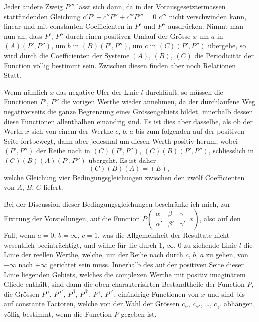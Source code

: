 \documentclass[12pt,a4paper]{book}
\theoremstyle{definition}
\theoremstyle{remark}
\begin{document}
Jeder andere Zweig $P'''$ lässt sich dann, da in der Vorausgesetztermassen stattfindenden Gleichung $c'P' + c''P'' + c'''P''' = 0$ $c'''$ nicht verschwinden kann, linear und mit constanten Coefficienten in $P'$ und $P''$ ausdrücken. Nimmt man nun an, dass $P'$, $P''$ durch einen positiven Umlauf der Grösse $x$ um $a$ in $(A)(P', P'')$, um $b$ in $(B)(P', P'')$, um $c$ in $(C)(P', P'')$ übergehe, so wird durch die Coefficienten der Systeme $(A)$, $(B)$, $(C)$ die Periodicität der Function völlig bestimmt sein. Zwischen diesen finden aber noch Relationen Statt.

Wenn nämlich $x$ das negative Ufer der Linie $l$ durchläuft, so müssen die Functionen $P'$, $P''$ die vorigen Werthe wieder annehmen, da der durchlaufene Weg negativerseits die ganze Begrenzung eines Grössengebiets bildet, innerhalb dessen diese Functionen allenthalben einändrig sind. Es ist dies aber dasselbe, als ob der Werth $x$ sich von einem der Werthe $c$, $b$, $a$ bis zum folgenden auf der positiven Seite fortbewegt, dann aber jedesmal um diesen Werth positiv herum, wobei $(P', P'')$ der Reihe nach in $(C)(P', P'')$, $(C)(B)(P', P'')$, schliesslich in $(C)(B)(A)(P', P'')$ übergeht. Es ist daher
\begin{equation}
(C)(B)(A) = (E), \tag{1}
\end{equation}
welche Gleichung vier Bedingungsgleichungen zwischen den zwölf Coefficienten von $A$, $B$, $C$ liefert.

Bei der Discussion dieser Bedingungsgleichungen beschränke ich mich, zur Fixirung der Vorstellungen, auf die Function $P\left(\begin{array}{ccc|} \alpha & \beta & \gamma \\ \alpha' & \beta' & \gamma' \end{array}\, x\right)$, also auf den Fall, wenn $a = 0$, $b = \infty$, $c = 1$, was die Allgemeinheit der Resultate nicht wesentlich beeinträchtigt, und wähle für die durch $1$, $\infty$, $0$ zu ziehende Linie $l$ die Linie der reellen Werthe, welche, um der Reihe nach durch $c$, $b$, $a$ zu gehen, von $-\infty$ nach $+\infty$ gerichtet sein muss. Innerhalb des auf der positiven Seite dieser Linie liegenden Gebiets, welches die complexen Werthe mit positiv imaginärem Gliede enthält, sind dann die oben charakterisirten Bestandtheile der Function $P$, die Grössen $P^{\alpha}$, $P^{\alpha'}$, $P^{\beta}$, $P^{\beta'}$, $P^{\gamma}$, $P^{\gamma'}$, einändrige Functionen von $x$ und sind bis auf constante Factoren, welche von der Wahl der Grössen $c_{\alpha}$, $c_{\alpha'}$, \dots, $c_{\gamma'}$ abhängen, völlig bestimmt, wenn die Function $P$ gegeben ist.
\end{document}
